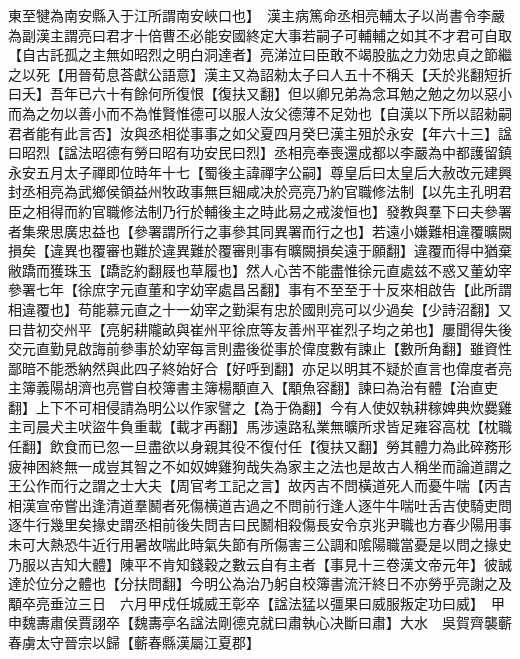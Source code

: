 東至犍為南安縣入于江所謂南安峽口也】　漢主病篤命丞相亮輔太子以尚書令李嚴為副漢主謂亮曰君才十倍曹丕必能安國終定大事若嗣子可輔輔之如其不才君可自取【自古託孤之主無如昭烈之明白洞達者】亮涕泣曰臣敢不竭股肱之力効忠貞之節繼之以死【用晉荀息荅獻公語意】漢主又為詔勑太子曰人五十不稱夭【夭於兆翻短折曰夭】吾年已六十有餘何所復恨【復扶又翻】但以卿兄弟為念耳勉之勉之勿以惡小而為之勿以善小而不為惟賢惟德可以服人汝父德薄不足効也【自漢以下所以詔勑嗣君者能有此言否】汝與丞相從事事之如父夏四月癸巳漢主殂於永安【年六十三】諡曰昭烈【諡法昭德有勞曰昭有功安民曰烈】丞相亮奉喪還成都以李嚴為中都護留鎮永安五月太子禪即位時年十七【蜀後主諱禪字公嗣】尊皇后曰太皇后大赦改元建興封丞相亮為武鄉侯領益州牧政事無巨細咸决於亮亮乃約官職修法制【以先主孔明君臣之相得而約官職修法制乃行於輔後主之時此易之戒浚恒也】發教與羣下曰夫參署者集衆思廣忠益也【參署謂所行之事參其同異署而行之也】若遠小嫌難相違覆曠闕損矣【違異也覆審也難於違異難於覆審則事有曠闕損矣遠于願翻】違覆而得中猶棄敝蹻而獲珠玉【蹻訖約翻屐也草履也】然人心苦不能盡惟徐元直處兹不惑又董幼宰參署七年【徐庶字元直董和字幼宰處昌呂翻】事有不至至于十反來相啟告【此所謂相違覆也】苟能慕元直之十一幼宰之勤渠有忠於國則亮可以少過矣【少詩沼翻】又曰昔初交州平【亮躬耕隴畝與崔州平徐庶等友善州平崔烈子均之弟也】屢聞得失後交元直勤見啟誨前參事於幼宰每言則盡後從事於偉度數有諫止【數所角翻】雖資性鄙暗不能悉納然與此四子終始好合【好呼到翻】亦足以明其不疑於直言也偉度者亮主簿義陽胡濟也亮嘗自校簿書主簿楊顒直入【顒魚容翻】諫曰為治有體【治直吏翻】上下不可相侵請為明公以作家譬之【為于偽翻】今有人使奴執耕稼婢典炊爨雞主司晨犬主吠盜牛負重載【載才再翻】馬涉遠路私業無曠所求皆足雍容高枕【枕職任翻】飲食而已忽一旦盡欲以身親其役不復付任【復扶又翻】勞其體力為此碎務形疲神困終無一成豈其智之不如奴婢雞狗哉失為家主之法也是故古人稱坐而論道謂之王公作而行之謂之士大夫【周官考工記之言】故丙吉不問橫道死人而憂牛喘【丙吉相漢宣帝嘗出逢清道羣鬭者死傷横道吉過之不問前行逢人逐牛牛喘吐舌吉使騎吏問逐牛行幾里矣掾史謂丞相前後失問吉曰民鬭相殺傷長安令京兆尹職也方春少陽用事未可大熱恐牛近行用暑故喘此時氣失節有所傷害三公調和隂陽職當憂是以問之掾史乃服以吉知大體】陳平不肯知錢穀之數云自有主者【事見十三卷漢文帝元年】彼誠達於位分之體也【分扶問翻】今明公為治乃躬自校簿書流汗終日不亦勞乎亮謝之及顒卒亮垂泣三日　六月甲戍任城威王彰卒【諡法猛以彊果曰威服叛定功曰威】　甲申魏夀肅侯賈詡卒【魏夀亭名諡法剛德克就曰肅執心决斷曰肅】大水　吳賀齊襲蘄春虜太守晉宗以歸【蘄春縣漢屬江夏郡】

